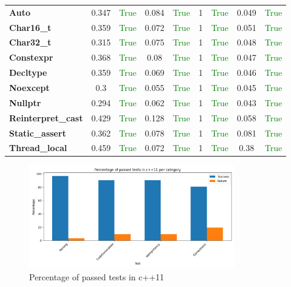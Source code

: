 \documentclass{article}
\begin{document}
\begin{xltabular}{\textwidth}{lcccccccc}
\textbf{{\fontsize{10}{12}\selectfont Auto}}& 0.347&\textcolor{green}{True}& 0.084&\textcolor{green}{True}& 1&\textcolor{green}{True}& 0.049&\textcolor{green}{True} \\[0.5ex]
\textbf{{\fontsize{10}{12}\selectfont Char16\_t}}& 0.359&\textcolor{green}{True}& 0.072&\textcolor{green}{True}& 1&\textcolor{green}{True}& 0.051&\textcolor{green}{True} \\[0.5ex]
\textbf{{\fontsize{10}{12}\selectfont Char32\_t}}& 0.315&\textcolor{green}{True}& 0.075&\textcolor{green}{True}& 1&\textcolor{green}{True}& 0.048&\textcolor{green}{True} \\[0.5ex]
\textbf{{\fontsize{10}{12}\selectfont Constexpr}}& 0.368&\textcolor{green}{True}& 0.08&\textcolor{green}{True}& 1&\textcolor{green}{True}& 0.047&\textcolor{green}{True} \\[0.5ex]
\textbf{{\fontsize{10}{12}\selectfont Decltype}}& 0.359&\textcolor{green}{True}& 0.069&\textcolor{green}{True}& 1&\textcolor{green}{True}& 0.046&\textcolor{green}{True} \\[0.5ex]
\textbf{{\fontsize{10}{12}\selectfont Noexcept}}& 0.3&\textcolor{green}{True}& 0.055&\textcolor{green}{True}& 1&\textcolor{green}{True}& 0.045&\textcolor{green}{True} \\[0.5ex]
\textbf{{\fontsize{10}{12}\selectfont Nullptr}}& 0.294&\textcolor{green}{True}& 0.062&\textcolor{green}{True}& 1&\textcolor{green}{True}& 0.043&\textcolor{green}{True} \\[0.5ex]
\textbf{{\fontsize{10}{12}\selectfont Reinterpret\_cast}}& 0.429&\textcolor{green}{True}& 0.128&\textcolor{green}{True}& 1&\textcolor{green}{True}& 0.058&\textcolor{green}{True} \\[0.5ex]
\textbf{{\fontsize{10}{12}\selectfont Static\_assert}}& 0.362&\textcolor{green}{True}& 0.078&\textcolor{green}{True}& 1&\textcolor{green}{True}& 0.081&\textcolor{green}{True} \\[0.5ex]
\textbf{{\fontsize{10}{12}\selectfont Thread\_local}}& 0.459&\textcolor{green}{True}& 0.072&\textcolor{green}{True}& 1&\textcolor{green}{True}& 0.38&\textcolor{green}{True} \\[0.5ex]
\bottomrule
\end{xltabular}
\newpage
\begin{figure}[h!]
\centering
\includegraphics[width=0.8\textwidth]{../reports/clava/images/c++11_percentage.png}
\caption{Percentage of passed tests in c++11}
\label{fig:c++11_percentage}
\end{figure}
\newpage
\end{document}
